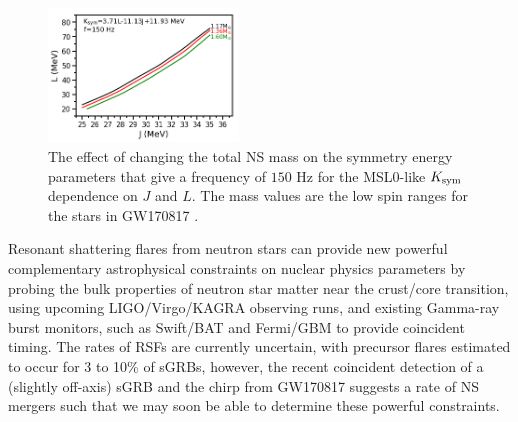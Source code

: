 \documentclass[fleqn,usenatbib]{mnras}
\begin{document}
\begin{figure}
\centering
\includegraphics[width=0.45\textwidth,angle=0]{vary_mass_MSL0.png}
\caption{The effect of changing the total NS mass on the symmetry energy parameters that give a frequency of $150$ Hz for the MSL0-like $K_{\rm sym}$ dependence on $J$ and $L$. The mass values are the low spin ranges for the stars in GW170817 \citet{abbott2017merger}.}
\label{fig:vary_mass_contours}
\end{figure}



Resonant shattering flares from neutron stars can provide new powerful complementary astrophysical constraints on nuclear physics parameters by probing the bulk properties of neutron star matter near the crust/core transition, using upcoming LIGO/Virgo/KAGRA observing runs, and existing Gamma-ray burst monitors, such as Swift/BAT and Fermi/GBM to provide coincident timing. The rates of RSFs are currently uncertain, with precursor flares estimated to occur for 3 to 10\% of sGRBs, however, the recent coincident detection of a (slightly off-axis) sGRB and the chirp from GW170817 suggests a rate of NS mergers such that we may soon be able to determine these powerful constraints. 
\end{document}
